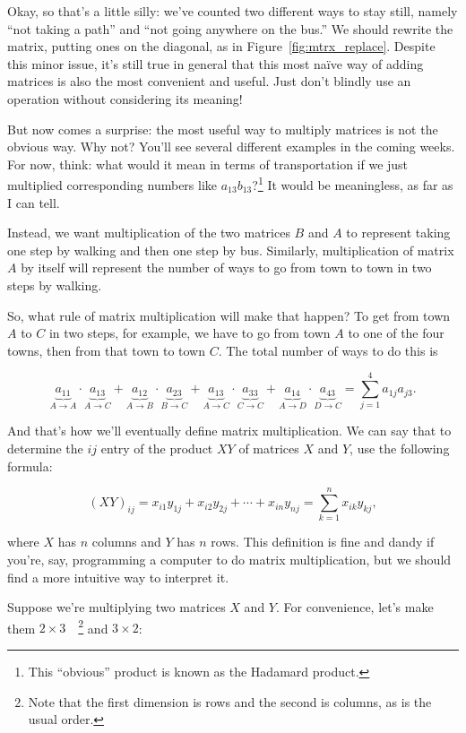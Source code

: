 \documentclass[../textbook.tex]{subfiles}
\begin{document}
\noindent Okay, so that's a little silly: we've counted two different ways to stay still, namely ``not taking a path'' and ``not going anywhere on the bus.'' We should rewrite the matrix, putting ones on the diagonal, as in Figure~\ref{fig:mtrx_replace}. Despite this minor issue, it's still true in general that this most naïve way of adding matrices is also the most convenient and useful. Just don't blindly use an operation without considering its meaning!


But now comes a surprise: the most useful way to multiply matrices is not the obvious way. Why not? You'll see several different examples in the coming weeks. For now, think: what would it mean in terms of transportation if we just multiplied corresponding numbers like $a_{13}b_{13}$?\footnote{This ``obvious'' product is known as the Hadamard product.} It would be meaningless, as far as I can tell.

Instead, we want multiplication of the two matrices $B$ and $A$ to represent taking one step by walking and then one step by bus. Similarly, multiplication of matrix $A$ by itself will represent the number of ways to go from town to town in two steps by walking.

So, what rule of matrix multiplication will make that happen? To get from town $A$ to $C$ in two steps, for example, we have to go from town $A$ to one of the four towns, then from that town to town $C$. The total number of ways to do this is

$$\underbrace{a_{11}}_{A\to A}\cdot \underbrace{a_{13}}_{A\to C}+\underbrace{a_{12}}_{A\to B}\cdot \underbrace{a_{23}}_{B\to C}+\underbrace{a_{13}}_{A\to C}\cdot \underbrace{a_{33}}_{C\to C}+\underbrace{a_{14}}_{A\to D}\cdot \underbrace{a_{43}}_{D\to C}=\sum_{j=1}^{4}a_{1j}a_{j3}.$$

\noindent And that's how we'll eventually define matrix multiplication. We can say that to determine the $ij$ entry of the product $XY$ of matrices $X$ and $Y$, use the following formula:

$$(XY)_{ij}=x_{i1}y_{1j}+x_{i2}y_{2j}+\cdots + x_{in}y_{nj} = \sum_{k=1}^n x_{ik} y_{kj},$$

\noindent where $X$ has $n$ columns and $Y$ has $n$ rows. This definition is fine and dandy if you're, say, programming a computer to do matrix multiplication, but we should find a more intuitive way to interpret it.

Suppose we're multiplying two matrices $X$ and $Y$. For convenience, let's make them $2\times 3\quad$\footnote{Note that the first dimension is rows and the second is columns, as is the usual order.} and $3\times 2$:
\end{document}
